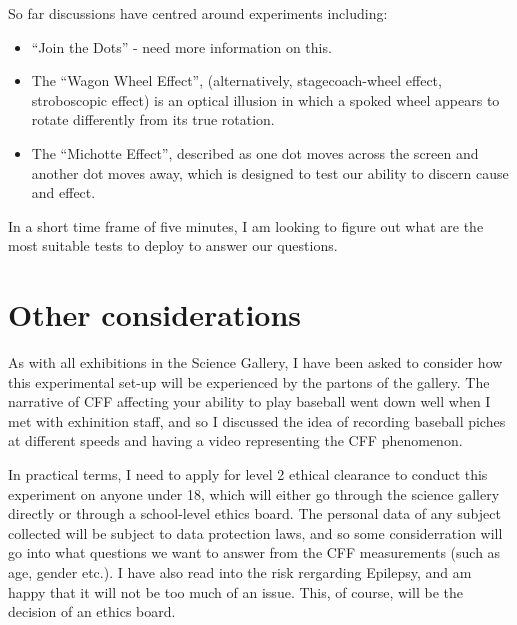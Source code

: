 \documentclass[12pt]{article}
\begin{document}
So far discussions have centred around experiments including:

\begin{itemize}
\item ``Join the Dots'' - need more information on this. 
\item The ``Wagon Wheel Effect'', (alternatively, stagecoach-wheel effect, stroboscopic effect) is an optical illusion in which a spoked wheel appears to rotate differently from its true rotation. 
\item The ``Michotte Effect'',  described as one dot moves across the screen and another dot moves away, which is designed to test our ability to discern cause and effect.  
\end{itemize}
In a short time frame of five minutes, I am looking to figure out what are the most suitable tests to deploy to answer our questions.




\section{Other considerations}
As with all exhibitions in the Science Gallery, I have been asked to consider how this experimental set-up will be experienced by the partons of the gallery. The narrative of CFF affecting your ability to play baseball went down well when I met with exhinition staff, and so I discussed the idea of recording baseball piches at different speeds and having a video representing the CFF phenomenon. 

In practical terms, I need to apply for level 2 ethical clearance to conduct this experiment on anyone under 18, which will either go through the science gallery directly or through a school-level ethics board. 
The personal data of any subject collected will be subject to data protection laws, and so some considerration will go into what questions we want to answer from the CFF measurements (such as age, gender etc.).
I have also read into the risk rergarding Epilepsy, and am happy that it will not be too much of an issue. This, of course, will be the decision of an ethics board.
\end{document}
